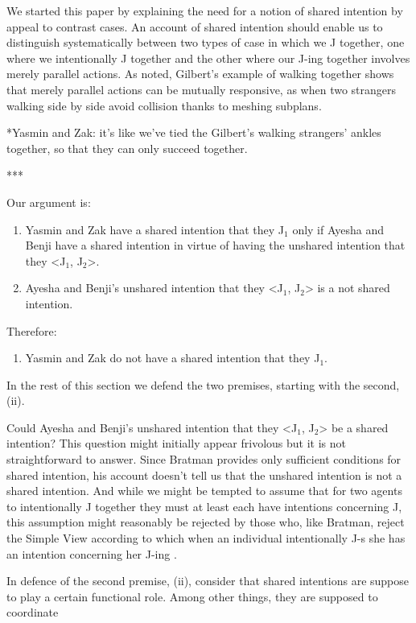 \documentclass[12pt,\papersize]{extarticle}
\begin{document}
We started this paper by explaining the need for a notion of shared intention by appeal to contrast cases. 
An account of shared intention should enable us to  distinguish systematically between two types of case in which we J together, one where we intentionally J together and the other where  our J-ing together involves  merely parallel actions.
As noted, Gilbert's example of walking together shows that merely parallel actions can be mutually responsive, as when two strangers walking side by side avoid collision thanks to meshing subplans.



*Yasmin and Zak: it's like we've tied the Gilbert's walking strangers' ankles together, so that they can only succeed together.





***


Our argument is:
\begin{enumerate}[label=\roman*]
\item Yasmin and Zak have a shared intention that they J$_1$ only if Ayesha and Benji have a shared intention in virtue of having the 
 unshared intention that they <J$_1$, J$_2$>.
\item Ayesha and Benji's unshared intention that they <J$_1$, J$_2$> is a not shared intention.
\end{enumerate}
%
Therefore:
%
\begin{enumerate}[resume,label=\roman*]
\item Yasmin and Zak do not have a shared intention that they J$_1$.
\end{enumerate}
%
In the rest of this section we defend the two premises, starting with the second, (ii).

Could Ayesha and Benji's unshared intention that they <J$_1$, J$_2$> be a  shared intention?
This question might initially appear frivolous but it is not straightforward to answer.
Since Bratman provides only sufficient conditions for shared intention, his account doesn't tell us that the unshared intention is not a shared intention.
And while we might be tempted to assume that for two agents to intentionally J together they must at least each have intentions concerning J, 
this assumption might reasonably be rejected by those who, like Bratman, reject the Simple View according to which when an individual intentionally J-s she has an intention concerning her J-ing \citep{Bratman:1984jr}.

In defence of the second premise, (ii), consider that shared intentions are suppose to play a certain functional role.
Among other things, they are supposed to coordinate 
\end{document}
